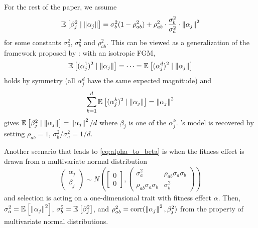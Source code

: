 \documentclass[10pt]{article}
\begin{document}
For the rest of the paper, we assume 
\begin{align} \label{eq:alpha_to_beta}
    \mathbb{E}_{}\left[\beta_j^2 \mid \left\| \alpha_j \right\|\right] = \sigma_b^2 (1- \rho_{ab}^2) + \rho_{ab}^2 \cdot \frac{\sigma_b^2}{\sigma_a^2} \cdot \left\| \alpha_j \right\|^2
\end{align}
for some constants $\sigma_a^2$, $\sigma_b^2$ and $\rho_{ab}^2$.
This can be viewed as a generalization of the framework proposed by \citet{Simons2018popgeninterpretation}: with an isotropic FGM,
\begin{align}
    \mathbb{E}_{}\left[(\alpha_j^1)^2 \mid \left\| \alpha_j \right\|\right] = \cdots =
    \mathbb{E}_{}\left[(\alpha_j^d)^2 \mid \left\| \alpha_j \right\|\right]
\end{align}
holds by symmetry (all $\alpha_j^d$ have the same expected magnitude) and 
\begin{align}
    \sum_{k=1}^d \mathbb{E}_{}\left[(\alpha_j^k)^2 \mid \left\| \alpha_j \right\|\right] = \left\| \alpha_j \right\|^2
\end{align}
gives $\mathbb{E}_{}\left[\beta_j^2 \mid \left\| \alpha_j \right\|\right] = \left\| \alpha_j \right\|^2 /d $ where $\beta_j$ is one of the $\alpha_j^k$. \citeauthor{Simons2018popgeninterpretation}'s model is recovered by setting $\rho_{ab}=1$, $\sigma_b^2/\sigma_a^2 = 1/d$.

Another scenario that leads to \eqref{eq:alpha_to_beta} is when the fitness effect is drawn from a multivariate normal distribution
\begin{gather} \label{eq:coa}
\begin{pmatrix}
        \alpha_j \\
        \beta_j
    \end{pmatrix}
    \sim
    N\left(
    \begin{bmatrix}
        0 \\
        0
    \end{bmatrix}
    , 
    \begin{pmatrix}
        \sigma_{a}^2 & \rho_{ab}\sigma_{a}\sigma_{b} \\
        \rho_{ab} \sigma_{a} \sigma_{b} & \sigma_{b}^2
    \end{pmatrix} 
    \right)
\end{gather}
and selection is acting on a one-dimensional trait with fitness effect $\alpha$.
Then, $\sigma_a^2 = \mathbb{E}_{}\left[\left\| \alpha_j \right\|^2\right]$, $\sigma_b^2=\mathbb{E}_{}\left[\beta_j^2\right]$, and $\rho_{ab}^2 = \mathrm{corr}(\left\| \alpha_j \right\|^2, \beta_j^2)$ from the property of multivariate normal distributions.
\end{document}
